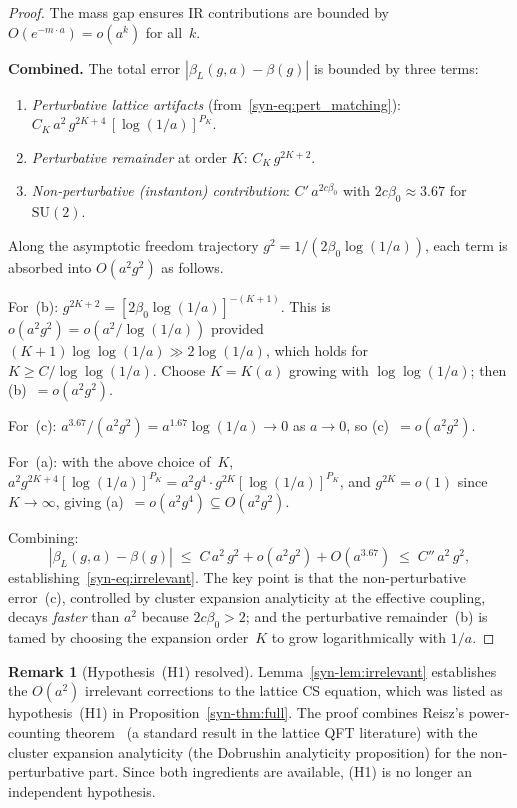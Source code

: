 \documentclass[11pt]{article}
\theoremstyle{definition}
\newtheorem{remark}[theorem]{Remark}
\newcommand{\SU}{\mathrm{SU}}
\begin{document}
\begin{proof}
The mass gap ensures IR contributions are bounded by
$O(e^{-m \cdot a}) = o(a^k)$ for all~$k$.

\smallskip
\noindent\textbf{Combined.}
The total error $|\beta_L(g,a) - \beta(g)|$ is bounded by
three terms:
\begin{enumerate}[label=(\alph*),nosep]
  \item \emph{Perturbative lattice artifacts}
    (from~\eqref{syn-eq:pert_matching}):
    $C_K\,a^2\,g^{2K+4}\,[\log(1/a)]^{P_K}$.
  \item \emph{Perturbative remainder} at order $K$:
    $C_K\,g^{2K+2}$.
  \item \emph{Non-perturbative (instanton) contribution}:
    $C'\,a^{2c\beta_0}$ with $2c\beta_0 \approx 3.67$
    for $\SU(2)$.
\end{enumerate}
Along the asymptotic freedom trajectory
$g^2 = 1/(2\beta_0\log(1/a))$, each term is absorbed
into $O(a^2 g^2)$ as follows.

For~(b): $g^{2K+2} = [2\beta_0\log(1/a)]^{-(K+1)}$.
This is $o(a^2 g^2) = o(a^2/\log(1/a))$ provided
$(K+1)\log\log(1/a) \gg 2\log(1/a)$, which holds for
$K \geq C/\log\log(1/a)$.  Choose $K = K(a)$ growing
with $\log\log(1/a)$; then (b)~$= o(a^2 g^2)$.

For~(c): $a^{3.67} / (a^2 g^2) = a^{1.67}\log(1/a) \to 0$
as $a \to 0$, so (c)~$= o(a^2 g^2)$.

For~(a): with the above choice of~$K$,
$a^2 g^{2K+4}[\log(1/a)]^{P_K}
= a^2 g^4 \cdot g^{2K}[\log(1/a)]^{P_K}$,
and $g^{2K} = o(1)$ since $K \to \infty$, giving
(a)~$= o(a^2 g^4) \subseteq O(a^2 g^2)$.

Combining:
\begin{equation}
  |\beta_L(g,a) - \beta(g)|
  \;\leq\; C\,a^2\,g^2
  + o(a^2 g^2)
  + O(a^{3.67})
  \;\leq\; C''\,a^2\,g^2,
\end{equation}
establishing~\eqref{syn-eq:irrelevant}.  The key point is that
the non-perturbative error~(c), controlled by cluster expansion
analyticity at the effective coupling, decays \emph{faster}
than $a^2$ because $2c\beta_0 > 2$; and the perturbative
remainder~(b) is tamed by choosing the expansion order~$K$
to grow logarithmically with $1/a$.
\end{proof}

\begin{remark}[Hypothesis~(H1) resolved]
\label{syn-rem:h1}
Lemma~\ref{syn-lem:irrelevant} establishes the $O(a^2)$
irrelevant corrections to the lattice CS equation, which
was listed as hypothesis~(H1) in
Proposition~\ref{syn-thm:full}.  The proof combines Reisz's
power-counting theorem~\cite{Reisz1988,Reisz89}
(a standard result in the lattice QFT literature)
with the cluster expansion analyticity
(the Dobrushin analyticity proposition) for the
non-perturbative part.  Since both ingredients are
available, (H1) is no longer an independent hypothesis.
\end{remark}
\end{document}
